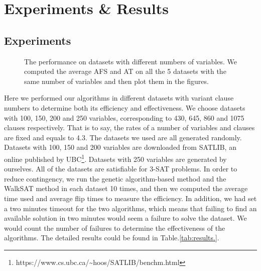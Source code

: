 
\section{Experiments \& Results}
\subsection{Experiments}
\begin{figure}[htbp]
	\centering
	\caption{The performance on datasets with different numbers of variables. We computed the average AFS and AT on all the 5 datasets with the same number of variables and then plot them in the figures.}
	\label{fig:performance}
\end{figure}
Here we performed our algorithms in different datasets with variant clause numbers to determine both its efficiency and effectiveness. We choose datasets with 100, 150, 200 and 250 variables, corresponding to 430, 645, 860 and 1075 clauses respectively. That is to say, the rates of a number of variables and clauses are fixed and equals to 4.3. The datasets we used are all generated randomly. Datasets with 100, 150 and 200 variables are downloaded from SATLIB, an online published by UBC\footnote{https://www.cs.ubc.ca/\textasciitilde hoos/SATLIB/benchm.html}. Datasets with 250 variables are generated by ourselves. All of the datasets are satisfiable for 3-SAT problems. In order to reduce contingency, we run the genetic algorithm-based method and the WalkSAT method in each dataset 10 times, and then we computed the average time used and average flip times to measure the efficiency. In addition, we had set a two minutes timeout for the two algorithms, which means that failing to find an available solution in two minutes would seem a failure to solve the dataset. We would count the number of failures to determine the effectiveness of the algorithms. The detailed results could be found in Table.\ref{tab:results.}.

